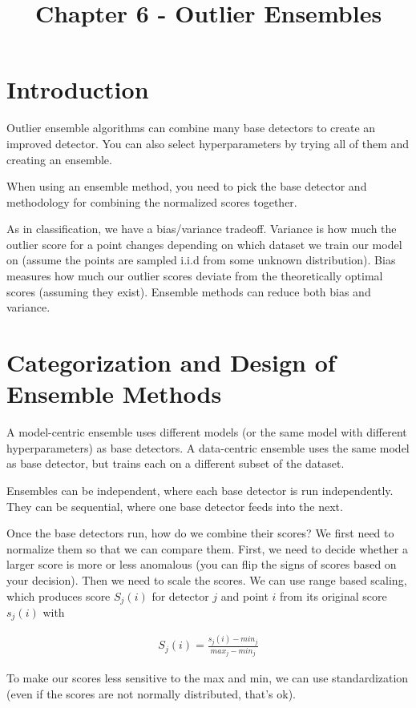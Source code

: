 \documentclass[a4paper]{article}
\title{Chapter 6 - Outlier Ensembles}
\date{}
\begin{document}
\maketitle

\section{Introduction}
Outlier ensemble algorithms can combine many base detectors to create an
improved detector. You can also select hyperparameters by trying all of them
and creating an ensemble.

When using an ensemble method, you need to pick the base detector and
methodology for combining the normalized scores together.

As in classification, we have a bias/variance tradeoff. Variance is how
much the outlier score for a point changes depending on which dataset we
train our model on (assume the points are sampled i.i.d from some
unknown distribution). Bias measures how much our outlier scores deviate from
the theoretically optimal scores (assuming they exist). Ensemble methods can
reduce both bias and variance.

\section{Categorization and Design of Ensemble Methods}
A model-centric ensemble uses different models (or the same model with
different hyperparameters) as base detectors. A data-centric ensemble uses
the same model as base detector, but trains each on a different subset of
the dataset.

Ensembles can be independent, where each base detector is run independently.
They can be sequential, where one base detector feeds into the next.

Once the base detectors run, how do we combine their scores? We first need
to normalize them so that we can compare them. First, we need to decide
whether a larger score is more or less anomalous (you can flip the signs of
scores based on your decision). Then we need to scale the scores. We can use
range based scaling, which produces score $S_j(i)$ for detector $j$ and point $i$ from its original score $s_j(i)$ with

\begin{align}
  S_j(i) = \frac{s_j(i) - min_j}{max_j - min_j}
\end{align}

To make our scores less sensitive to the max and min, we can use
standardization (even if the scores are not normally distributed, that's ok).
\end{document}
